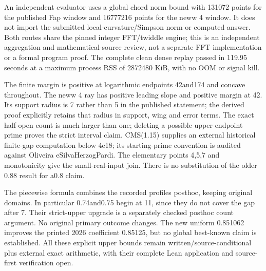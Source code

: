 \documentclass[11pt]{article}
\begin{document}
An independent evaluator uses a global chord norm bound with 131072 points for the published Fap window and 16777216 points for the neww 4 window. It does not import the submitted local-curvature/Simpson norm or computed answer. Both routes share the pinned integer FFT/twiddle engine; this is an independent aggregation and mathematical-source review, not a separate FFT implementation or a formal program proof. The complete clean dense replay passed in 119.95 seconds at a maximum process RSS of 2872480 KiB, with no OOM or signal kill.


The finite margin is positive at logarithmic endpoints 42and174 and concave throughout. The neww 4 ray has positive leading slope and positive margin at 42. Its support radius is 7 rather than 5 in the published statement; the derived proof explicitly retains that radius in support, wing and error terms. The exact half-open count is much larger than one; deleting a possible upper-endpoint prime proves the strict interval claim. CMS(1.15) supplies an external historical finite-gap computation below 4e18; its starting-prime convention is audited against Oliveira eSilvaHerzogPardi. The elementary points 4,5,7 and monotonicity give the small-real-input join. There is no substitution of the older 0.88 result for a0.8 claim.


The piecewise formula combines the recorded profiles posthoc, keeping original domains. In particular 0.74and0.75 begin at 11, since they do not cover the gap after 7. Their strict-upper upgrade is a separately checked posthoc count argument. No original primary outcome changes. The new uniform 0.851062 improves the printed 2026 coefficient 0.85125, but no global best-known claim is established. All these explicit upper bounds remain written/source-conditional plus external exact arithmetic, with their complete Lean application and source-first verification open.


\begin{center}


\ifdim\wd\eqbox>\linewidth\resizebox{\linewidth}{!}{\usebox{\eqbox}}\else\usebox{\eqbox}\fi

\end{center}
\end{document}
